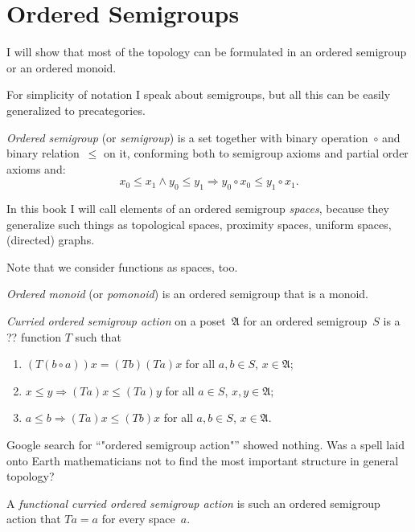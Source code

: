 \chapter{Ordered Semigroups}

I will show that most of the topology can be formulated in an ordered semigroup or an ordered monoid.

For simplicity of notation I speak about semigroups, but all this can be easily generalized to precategories.

\begin{defn}
\emph{Ordered semigroup} (or \emph{semigroup}) is a set together with binary operation~$\circ$ and binary relation~$\leq$ on it, conforming both to semigroup axioms and partial order axioms and:
\[ x_0\leq x_1\land y_0\leq y_1\Rightarrow y_0\circ x_0\leq y_1\circ x_1. \]
\end{defn}

In this book I will call elements of an ordered semigroup \emph{spaces}, because they generalize such things as topological spaces, proximity spaces, uniform spaces, (directed) graphs.

Note that we consider functions as spaces, too.

\begin{defn}
\emph{Ordered monoid} (or \emph{pomonoid}) is an ordered semigroup that is a monoid.
\end{defn}

\begin{defn}
\emph{Curried ordered semigroup action} on a poset~$\mathfrak{A}$ for an ordered semigroup~$S$ is a ?? function $T$ such that
\begin{enumerate}
\item $(T(b\circ a))x = (Tb)(Ta)x$ for all $a,b\in S$, $x\in\mathfrak{A}$;
\item $x\leq y\Rightarrow(Ta)x\leq (Ta)y$ for all $a\in S$, $x,y\in\mathfrak{A}$;
\item $a\leq b\Rightarrow(Ta)x\leq (Tb)x$ for all $a,b\in S$, $x\in\mathfrak{A}$.
\end{enumerate}
\end{defn}

\begin{rem}
Google search for ``"ordered semigroup action"'' showed nothing. Was a spell laid onto Earth mathematicians not to find the most important structure in general topology?
\end{rem}

\begin{defn}
A \emph{functional curried ordered semigroup action} is such an ordered semigroup action that $Ta=a$ for every space~$a$.
\end{defn}

